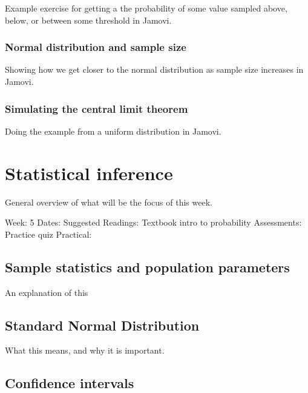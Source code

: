 \documentclass[
]{book}
\begin{document}
Example exercise for getting a the probability of some value sampled above, below, or between some threshold in Jamovi.

\hypertarget{normal-distribution-and-sample-size}{%
\section{Normal distribution and sample size}\label{normal-distribution-and-sample-size}}

Showing how we get closer to the normal distribution as sample size increases in Jamovi.

\hypertarget{simulating-the-central-limit-theorem}{%
\section{Simulating the central limit theorem}\label{simulating-the-central-limit-theorem}}

Doing the example from a uniform distribution in Jamovi.

\hypertarget{part-statistical-inference}{%
\part{Statistical inference}\label{part-statistical-inference}}

General overview of what will be the focus of this week.

Week: 5
Dates:
Suggested Readings: Textbook intro to probability
Assessments: Practice quiz
Practical:

\hypertarget{sample-statistics-and-population-parameters}{%
\chapter{Sample statistics and population parameters}\label{sample-statistics-and-population-parameters}}

An explanation of this

\hypertarget{standard-normal-distribution}{%
\chapter{Standard Normal Distribution}\label{standard-normal-distribution}}

What this means, and why it is important.

\hypertarget{confidence-intervals}{%
\chapter{Confidence intervals}\label{confidence-intervals}}
\end{document}
